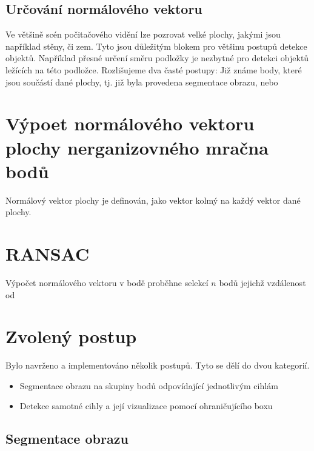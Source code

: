 \documentclass[twoside]{ctuthesis}
\begin{document}
\subsection{Určování normálového vektoru}
Ve většině scén počitačového vidění lze pozrovat velké plochy, jakými jsou například stěny, či zem. Tyto jsou důležitým blokem pro většinu postupů detekce objektů. Například přesné určení směru podložky je nezbytné pro detekci objektů ležících na této podložce. Rozlišujeme dva časté postupy: Již známe body, které jsou součástí dané plochy, tj. již byla provedena segmentace obrazu, nebo 

\section{Výpoet normálového vektoru plochy nerganizovného mračna bodů} 
Normálový vektor plochy je definován, jako vektor kolmý na každý vektor dané plochy. 
\section{RANSAC}
    Výpočet normálového vektoru v bodě proběhne selekcí $n$ bodů jejichž vzdálenost od 

\section{Zvolený postup}
Bylo navrženo a implementováno několik postupů. Tyto se dělí do dvou kategorií.
\begin{itemize}
    \item Segmentace obrazu na skupiny bodů odpovídající jednotlivým cihlám
    \item Detekce samotné cihly a její vizualizace pomocí ohraničujícího boxu
\end{itemize}

\subsection{Segmentace obrazu}
\end{document}
